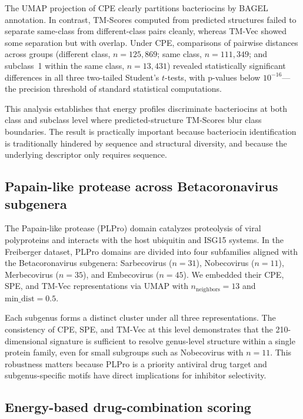 \documentclass[11pt]{article}
\begin{document}
The UMAP projection of CPE clearly partitions bacteriocins by BAGEL
annotation. In contrast, TM-Scores computed from predicted structures
failed to separate same-class from different-class pairs cleanly, whereas
TM-Vec showed some separation but with overlap. Under CPE, comparisons of
pairwise distances across groups (different class, $n=125{,}869$; same
class, $n=111{,}349$; and subclass~1 within the same class, $n=13{,}431$)
revealed statistically significant differences in all three two-tailed
Student's $t$-tests, with p-values below $10^{-16}$---the precision
threshold of standard statistical computations.

This analysis establishes that energy profiles discriminate bacteriocins at
both class and subclass level where predicted-structure TM-Scores blur
class boundaries. The result is practically important because bacteriocin
identification is traditionally hindered by sequence and structural
diversity, and because the underlying descriptor only requires sequence.

\subsection{Papain-like protease across Betacoronavirus subgenera}

The Papain-like protease (PLPro) domain catalyzes proteolysis of viral
polyproteins and interacts with the host ubiquitin and ISG15 systems. In
the Freiberger dataset, PLPro domains are divided into four subfamilies
aligned with the Betacoronavirus subgenera: Sarbecovirus ($n=31$),
Nobecovirus ($n=11$), Merbecovirus ($n=35$), and Embecovirus ($n=45$).
We embedded their CPE, SPE, and TM-Vec representations via UMAP with
$n_\text{neighbors}=13$ and $\text{min\_dist}=0.5$.

Each subgenus forms a distinct cluster under all three representations.
The consistency of CPE, SPE, and TM-Vec at this level demonstrates that the
210-dimensional signature is sufficient to resolve genus-level structure
within a single protein family, even for small subgroups such as
Nobecovirus with $n=11$. This robustness matters because PLPro is a priority
antiviral drug target and subgenus-specific motifs have direct implications
for inhibitor selectivity.

\subsection{Energy-based drug-combination scoring}
\end{document}
